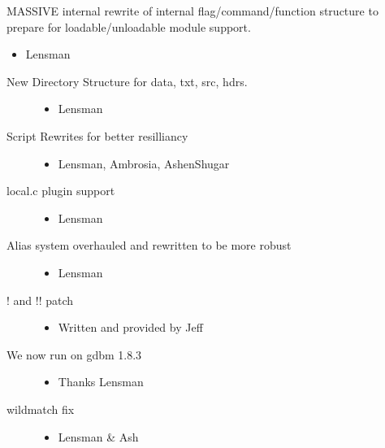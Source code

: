 \documentclass[letterpaper,10pt,english]{sphinxmanual}
\begin{document}
\sphinxAtStartPar
MASSIVE internal rewrite of internal flag/command/function structure
to prepare for loadable/unloadable module support.
\begin{itemize}
\item {} 
\sphinxAtStartPar
Lensman

\end{itemize}
\begin{description}
\item[{New Directory Structure for data, txt, src, hdrs.}] \leavevmode\begin{itemize}
\item {} 
\sphinxAtStartPar
Lensman

\end{itemize}

\item[{Script Rewrites for better resilliancy}] \leavevmode\begin{itemize}
\item {} 
\sphinxAtStartPar
Lensman, Ambrosia, Ashen\sphinxhyphen{}Shugar

\end{itemize}

\item[{local.c plugin support}] \leavevmode\begin{itemize}
\item {} 
\sphinxAtStartPar
Lensman

\end{itemize}

\item[{Alias system overhauled and rewritten to be more robust}] \leavevmode\begin{itemize}
\item {} 
\sphinxAtStartPar
Lensman

\end{itemize}

\item[{! and !! patch}] \leavevmode\begin{itemize}
\item {} 
\sphinxAtStartPar
Written and provided by Jeff

\end{itemize}

\item[{We now run on gdbm 1.8.3}] \leavevmode\begin{itemize}
\item {} 
\sphinxAtStartPar
Thanks Lensman

\end{itemize}

\item[{wildmatch fix}] \leavevmode\begin{itemize}
\item {} 
\sphinxAtStartPar
Lensman \& Ash

\end{itemize}

\end{description}
\end{document}
